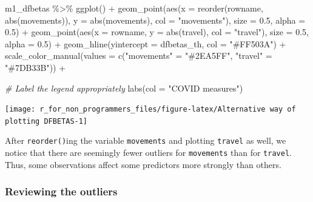 \documentclass[
]{book}
\newenvironment{Shaded}{\begin{snugshade}}{\end{snugshade}}
\newcommand{\AttributeTok}[1]{\textcolor[rgb]{0.77,0.63,0.00}{#1}}
\newcommand{\CommentTok}[1]{\textcolor[rgb]{0.56,0.35,0.01}{\textit{#1}}}
\newcommand{\FloatTok}[1]{\textcolor[rgb]{0.00,0.00,0.81}{#1}}
\newcommand{\FunctionTok}[1]{\textcolor[rgb]{0.00,0.00,0.00}{#1}}
\newcommand{\NormalTok}[1]{#1}
\newcommand{\OtherTok}[1]{\textcolor[rgb]{0.56,0.35,0.01}{#1}}
\newcommand{\SpecialCharTok}[1]{\textcolor[rgb]{0.00,0.00,0.00}{#1}}
\newcommand{\StringTok}[1]{\textcolor[rgb]{0.31,0.60,0.02}{#1}}
\begin{document}
\begin{Shaded}
\begin{Highlighting}[]
\NormalTok{m1\_dfbetas }\SpecialCharTok{\%\textgreater{}\%}
  \FunctionTok{ggplot}\NormalTok{() }\SpecialCharTok{+}
  \FunctionTok{geom\_point}\NormalTok{(}\FunctionTok{aes}\NormalTok{(}\AttributeTok{x =} \FunctionTok{reorder}\NormalTok{(rowname, }\FunctionTok{abs}\NormalTok{(movements)),}
                 \AttributeTok{y =} \FunctionTok{abs}\NormalTok{(movements),}
                 \AttributeTok{col =} \StringTok{"movements"}\NormalTok{),}
             \AttributeTok{size =} \FloatTok{0.5}\NormalTok{,}
             \AttributeTok{alpha =} \FloatTok{0.5}\NormalTok{) }\SpecialCharTok{+}
  \FunctionTok{geom\_point}\NormalTok{(}\FunctionTok{aes}\NormalTok{(}\AttributeTok{x =}\NormalTok{ rowname,}
                 \AttributeTok{y =} \FunctionTok{abs}\NormalTok{(travel),}
                 \AttributeTok{col =} \StringTok{"travel"}\NormalTok{),}
             \AttributeTok{size =} \FloatTok{0.5}\NormalTok{,}
             \AttributeTok{alpha =} \FloatTok{0.5}\NormalTok{) }\SpecialCharTok{+}
  \FunctionTok{geom\_hline}\NormalTok{(}\AttributeTok{yintercept =}\NormalTok{ dfbetas\_th, }\AttributeTok{col =} \StringTok{"\#FF503A"}\NormalTok{) }\SpecialCharTok{+}
  \FunctionTok{scale\_color\_manual}\NormalTok{(}\AttributeTok{values =} \FunctionTok{c}\NormalTok{(}\StringTok{"movements"} \OtherTok{=} \StringTok{"\#2EA5FF"}\NormalTok{,}
                       \StringTok{"travel"} \OtherTok{=} \StringTok{"\#7DB33B"}\NormalTok{)) }\SpecialCharTok{+}
  
  \CommentTok{\# Label the legend appropriately}
  \FunctionTok{labs}\NormalTok{(}\AttributeTok{col =} \StringTok{"COVID measures"}\NormalTok{)}
\end{Highlighting}
\end{Shaded}

\begin{center}\texttt{[image: r\_for\_non\_programmers\_files/figure-latex/Alternative way of plotting DFBETAS-1]} \end{center}

After \texttt{reorder()}ing the variable \texttt{movements} and plotting \texttt{travel} as well, we notice that there are seemingly fewer outliers for \texttt{movements} than for \texttt{travel}. Thus, some observations affect some predictors more strongly than others.

\hypertarget{reviewing-the-outliers}{%
\subsubsection{Reviewing the outliers}\label{reviewing-the-outliers}}
\end{document}
